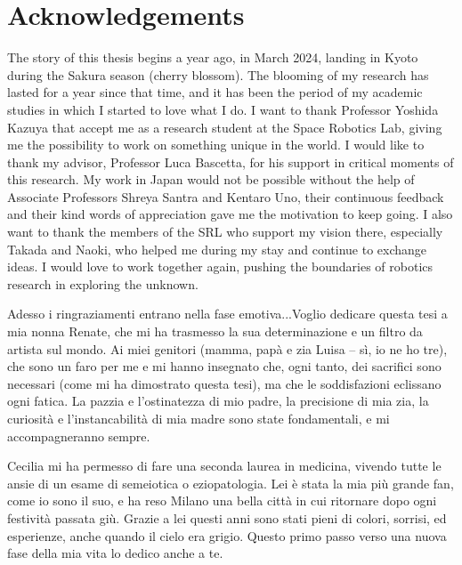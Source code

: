 \chapter*{Acknowledgements}

The story of this thesis begins a year ago, in March 2024, landing in Kyoto during the Sakura season (cherry blossom). The blooming of my research has lasted for a year since that time, and it has been the period of my academic studies in which I started to love what I do. I want to thank Professor Yoshida Kazuya that accept me as a research student at the Space Robotics Lab, giving me the possibility to work on something unique in the world. I would like to thank my advisor, Professor Luca Bascetta, for his support in critical moments of this research.
My work in Japan would not be possible without the help of Associate Professors Shreya Santra and Kentaro Uno, their continuous feedback and their kind words of appreciation gave me the motivation to keep going. I also want to thank the members of the SRL who support my vision there, especially Takada and Naoki, who helped me during my stay and continue to exchange ideas. I would love to work together again, pushing the boundaries of robotics research in exploring the unknown. 

Adesso i ringraziamenti entrano nella fase emotiva...Voglio dedicare questa tesi a mia nonna Renate, che mi ha trasmesso la sua determinazione e un filtro da artista sul mondo. Ai miei genitori (mamma, papà e zia Luisa – sì, io ne ho tre), che sono un faro per me e mi hanno insegnato che, ogni tanto, dei sacrifici sono necessari (come mi ha dimostrato questa tesi), ma che le soddisfazioni eclissano ogni fatica. La pazzia e l’ostinatezza di mio padre, la precisione di mia zia, la curiosità e l’instancabilità di mia madre sono state fondamentali, e mi accompagneranno sempre. 

Cecilia mi ha permesso di fare una seconda laurea in medicina, vivendo tutte le ansie di un esame di semeiotica o eziopatologia. Lei è stata la mia più grande fan, come io sono il suo, e ha reso Milano una bella città in cui ritornare dopo ogni festività passata giù. Grazie a lei questi anni sono stati pieni di colori, sorrisi, ed esperienze, anche quando il cielo era grigio. Questo primo passo verso una nuova fase della mia vita lo dedico anche a te. 

